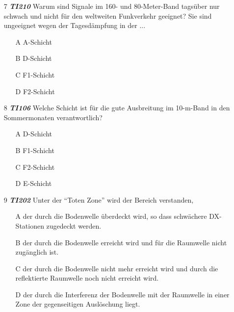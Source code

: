 \begin{enumerate} 
\itemsep1pt\parskip0pt
\item[7] \emph{\textbf{TI210}}   Warum sind Signale im 160- und 80-Meter-Band tagsüber nur schwach und nicht für den weltweiten Funkverkehr geeignet? Sie sind ungeeignet wegen der Tagesdämpfung in der ...
	\begin{enumerate}
	\itemsep1pt\parskip0pt
		\item[A] A-Schicht
		\item[B] D-Schicht
		\item[C] F1-Schicht
		\item[D] F2-Schicht
	\end{enumerate}
\end{enumerate}


\begin{enumerate} 
\itemsep1pt\parskip0pt
\item[8] \emph{\textbf{TI106}}   Welche Schicht ist für die gute Ausbreitung im 10-m-Band in den Sommermonaten verantwortlich?
	\begin{enumerate}
	\itemsep1pt\parskip0pt
		\item[A] D-Schicht
		\item[B] F1-Schicht
		\item[C] F2-Schicht
		\item[D] E-Schicht
	\end{enumerate}
\end{enumerate}


\begin{enumerate} 
\itemsep1pt\parskip0pt
\item[9] \emph{\textbf{TI202}}   Unter der ``Toten Zone'' wird der Bereich verstanden,
	\begin{enumerate}
	\itemsep1pt\parskip0pt
		\item[A] der durch die Bodenwelle überdeckt wird, so dass schwächere DX-Stationen zugedeckt werden.
		\item[B] der durch die Bodenwelle erreicht wird und für die Raumwelle nicht zugänglich ist.
		\item[C] der durch die Bodenwelle nicht mehr erreicht wird und durch die reflektierte Raumwelle noch nicht erreicht wird.
		\item[D] der durch die Interferenz der Bodenwelle mit der Raumwelle in einer Zone der gegenseitigen Auslöschung liegt.
	\end{enumerate}
\end{enumerate}

